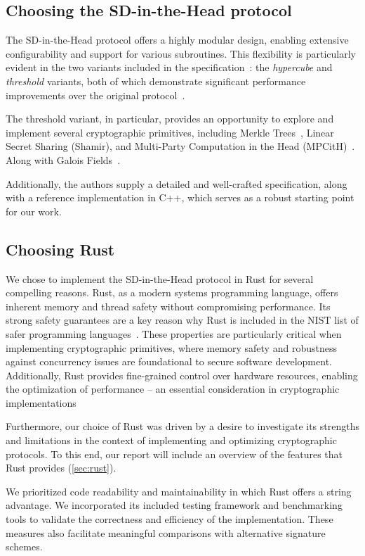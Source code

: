 \documentclass[twoside,11pt]{report}
\theoremstyle{definition}
\theoremstyle{plain}
\begin{document}
\subsection{Choosing the SD-in-the-Head protocol}
The SD-in-the-Head protocol offers a highly modular design, enabling extensive configurability and support for various subroutines. This flexibility is particularly evident in the two variants included in the specification~\cite{aguilarsyndrome11}: the \textit{hypercube} and \textit{threshold} variants, both of which demonstrate significant performance improvements over the original protocol~\cite{feneuil2022syndrome,aguilar2023return,feneuil2023threshold}.

The threshold variant, in particular, provides an opportunity to explore and implement several cryptographic primitives, including Merkle Trees~\cite{becker2008merkle}, Linear Secret Sharing (Shamir), and Multi-Party Computation in the Head (MPCitH)~\cite{baum2020concretely}. Along with Galois Fields~\cite{brownadvanced}.

Additionally, the authors supply a detailed and well-crafted specification, along with a reference implementation in C++, which serves as a robust starting point for our work.


\subsection{Choosing Rust}
We chose to implement the SD-in-the-Head protocol in Rust for several compelling reasons. Rust, as a modern systems programming language, offers inherent memory and thread safety without compromising performance. Its strong safety guarantees\cite{jung2017rustbelt} are a key reason why Rust is included in the NIST list of safer programming languages~\cite{nistsaferlanguages}. These properties are particularly critical when implementing cryptographic primitives, where memory safety and robustness against concurrency issues are foundational to secure software development. Additionally, Rust provides fine-grained control over hardware resources, enabling the optimization of performance -- an essential consideration in cryptographic implementations

Furthermore, our choice of Rust was driven by a desire to investigate its strengths and limitations in the context of implementing and optimizing cryptographic protocols. To this end, our report will include an overview of the features that Rust provides (\autoref{sec:rust}).

We prioritized code readability and maintainability in which Rust offers a string advantage. We incorporated its included testing framework and benchmarking tools to validate the correctness and efficiency of the implementation. These measures also facilitate meaningful comparisons with alternative signature schemes.
\end{document}
